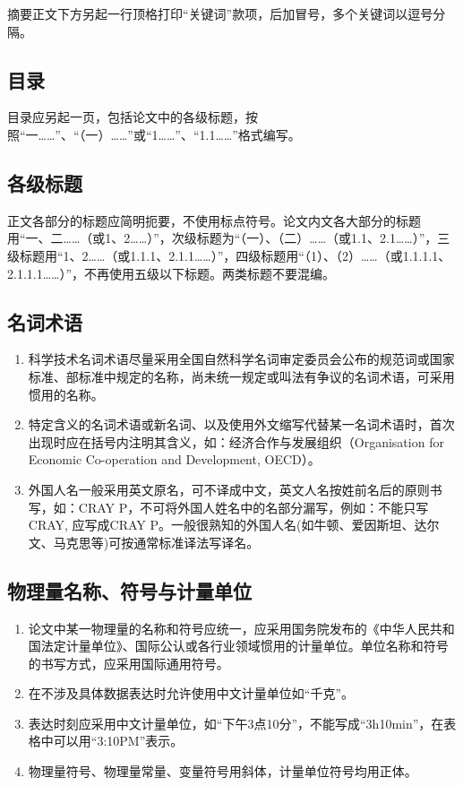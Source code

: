 摘要正文下方另起一行顶格打印``关键词''款项，后加冒号，多个关键词以逗号分隔。

\subsection{目录}

目录应另起一页，包括论文中的各级标题，按照``一……''、``（一）……''或``1……''、``1.1……''格式编写。

\subsection{各级标题}

正文各部分的标题应简明扼要，不使用标点符号。论文内文各大部分的标题用``一、二……（或1、2……）''，次级标题为``（一）、（二）……（或1.1、2.1……）''，三级标题用``1、2……（或1.1.1、2.1.1……）''，四级标题用``（1）、（2）……（或1.1.1.1、2.1.1.1……）''，不再使用五级以下标题。两类标题不要混编。

\subsection{名词术语}

\begin{enumerate}
    \item 科学技术名词术语尽量采用全国自然科学名词审定委员会公布的规范词或国家标准、部标准中规定的名称，尚未统一规定或叫法有争议的名词术语，可采用惯用的名称。
    \item 特定含义的名词术语或新名词、以及使用外文缩写代替某一名词术语时，首次出现时应在括号内注明其含义，如：经济合作与发展组织（Organisation for Economic Co-operation and Development, OECD）。
    \item 外国人名一般采用英文原名，可不译成中文，英文人名按姓前名后的原则书写，如：CRAY P，不可将外国人姓名中的名部分漏写，例如：不能只写CRAY, 应写成CRAY P。一般很熟知的外国人名(如牛顿、爱因斯坦、达尔文、马克思等)可按通常标准译法写译名。
\end{enumerate}

\subsection{物理量名称、符号与计量单位}

\begin{enumerate}
    \item 论文中某一物理量的名称和符号应统一，应采用国务院发布的《中华人民共和国法定计量单位》、国际公认或各行业领域惯用的计量单位。单位名称和符号的书写方式，应采用国际通用符号。
    \item 在不涉及具体数据表达时允许使用中文计量单位如``千克''。
    \item 表达时刻应采用中文计量单位，如``下午3点10分''，不能写成``3h10min''，在表格中可以用``3:10PM''表示。
    \item 物理量符号、物理量常量、变量符号用斜体，计量单位符号均用正体。
\end{enumerate}

